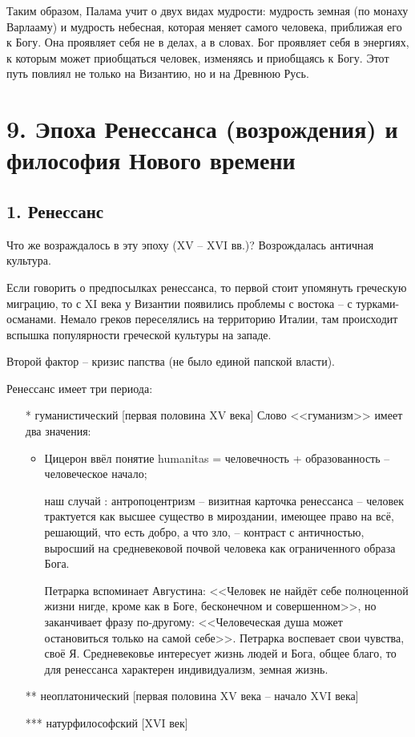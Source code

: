 \documentclass[a4paper, 12pt]{book} %
\begin{document}
Таким образом, Палама учит о двух видах  мудрости: мудрость земная (по монаху Варлааму) и мудрость небесная, которая меняет самого человека, приближая его к Богу. Она проявляет себя не в делах, а в словах. Бог проявляет себя в энергиях, к которым может приобщаться человек, изменяясь и приобщаясь к Богу. Этот путь повлиял не только на Византию, но и на Древнюю Русь.

\section*{9. Эпоха Ренессанса (возрождения) и философия Нового времени}
\subsection*{1. Ренессанс}
Что же возраждалось в эту эпоху (XV -- XVI вв.)? Возрождалась античная культура. 

Если говорить о предпосылках ренессанса, то первой стоит упомянуть греческую миграцию, то с XI века у Византии появились проблемы с востока -- с турками-османами. Немало греков переселялись на территорию Италии, там происходит вспышка популярности греческой культуры на западе.

Второй фактор -- кризис папства (не было единой папской власти).

Ренессанс имеет три периода:
\begin{itemize}
\item[*] гуманистический [первая половина XV века]
Слово <<гуманизм>> имеет два значения:
\begin{itemize}
\item Цицерон ввёл понятие humanitas = человечность + образованность -- человеческое начало;
\item [наш случай]: антропоцентризм -- визитная карточка ренессанса -- человек трактуется как высшее существо в мироздании, имеющее право на всё, решающий, что есть добро, а что зло, -- контраст с античностью, выросший на средневековой почвой человека как ограниченного образа Бога.

Петрарка вспоминает Августина: <<Человек не найдёт себе полноценной жизни нигде, кроме как в Боге, бесконечном и совершенном>>, но заканчивает фразу по-другому: <<Человеческая душа может остановиться только на самой себе>>. Петрарка воспевает свои чувства, своё Я. Средневековье интересует жизнь людей и Бога, общее благо, то для ренессанса характерен индивидуализм, земная жизнь. 
\end{itemize}
\item[**] неоплатонический [первая половина XV века -- начало XVI века]
\item[***] натурфилософский [XVI век]
\end{itemize}
\end{document}
